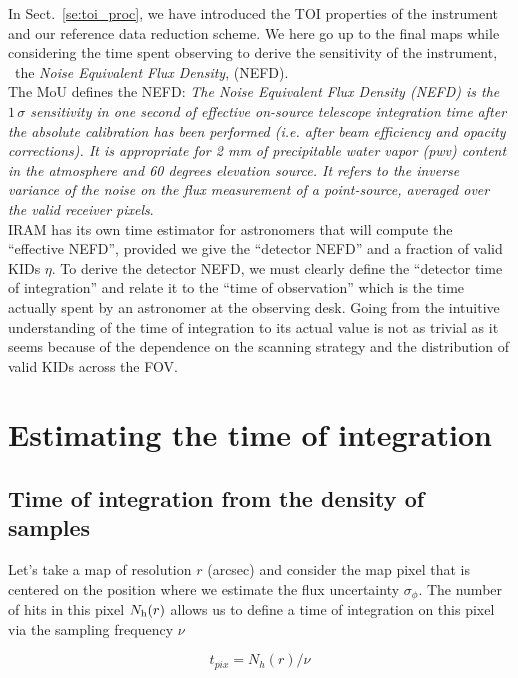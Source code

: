 
In Sect.~\ref{se:toi_proc}, we have introduced the TOI properties of the
instrument and our reference data reduction scheme. We here go up to the final
maps while considering the time spent observing to derive the sensitivity of the
instrument, \aka\ the \emph{Noise Equivalent Flux Density}, (NEFD).\\

The MoU defines the NEFD:  \emph{The Noise Equivalent Flux Density (NEFD)
  is the $1\,\sigma$ sensitivity in one second of effective on-source telescope
  integration time after the absolute calibration has been performed (i.e. after
  beam efficiency and opacity corrections). It is appropriate for 2 mm of
  precipitable water vapor (pwv) content in the atmosphere and 60 degrees
  elevation source. It refers to the inverse variance of the noise on the flux
  measurement of a point-source, averaged over the valid receiver pixels}.\\

IRAM has its own time estimator for astronomers that will compute the ``effective NEFD'',
provided we give the ``detector NEFD'' and a fraction of valid KIDs $\eta$. To
derive the detector NEFD, we must clearly define the ``detector time of
integration'' and relate it to the ``time of observation'' which is the time
actually spent by an astronomer at the observing desk. Going from the intuitive
understanding of the time of integration to its actual value is not as trivial
as it seems because of the dependence on the scanning strategy and the
distribution of valid KIDs across the FOV.

\section{Estimating the time of integration}

\subsection{Time of integration from the density of samples}

Let's take a map of resolution $r$ (arcsec) and consider the map pixel that is
centered on the position where we estimate the flux uncertainty
$\sigma_\phi$. The number of hits in this pixel $N_{\rm{h}}(r)$ allows us to define a
time of integration on this pixel via the sampling frequency $\nu$

\begin{equation}
t_{pix} = N_h(r)/\nu
\end{equation}

